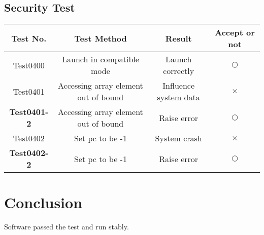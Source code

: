 \documentclass{article}
\begin{document}
		\subsection{Security Test}
		\begin{center}
			\begin{tabular}{cccc}
			\toprule
			Test No. & Test Method & Result & Accept or not \\
			\midrule
			Test0400 & Launch in compatible mode & Launch correctly & $ \bigcirc $ \\
			Test0401 & Accessing array element out of bound & Influence system data & $ \times $ \\
			\textbf{Test0401-2} & Accessing array element out of bound & Raise error & $ \bigcirc $ \\
			Test0402 & Set pc to be -1 & System crash & $ \times $\\
			\textbf{Test0402-2} & Set pc to be -1 & Raise error & $  \bigcirc $\\
			\bottomrule
			\end{tabular}
			\end{center}
		\section{Conclusion}
		Software passed the test and run stably.
	
\end{document}
